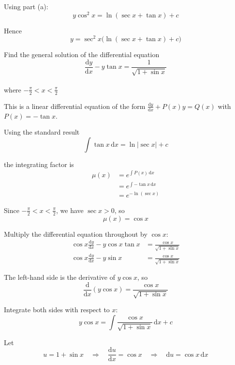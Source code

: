 \documentclass[leqno]{article}
\begin{document}
\begin{enumerate}[
  label=\textbf{\arabic*.},
  leftmargin=*,
  topsep=0pt,
  partopsep=0pt,
  parsep=0pt
]
\begin{djsSolution}
\begin{enumerate}[label=\textbf{(\alph*)}]
  Using part (a):
  \[
  y\cos^2 x=\ln(\sec x+\tan x)+c
  \]

  Hence
  \[
  y=\sec^2 x\bigl(\ln(\sec x+\tan x)+c\bigr)
  \]
\end{enumerate}
\end{djsSolution}


\newpage

\questionitem

Find the general solution of the differential equation\\
\[
\frac{\mathrm{d}y}{\mathrm{d}x} - y\tan x = \frac{1}{\sqrt{1+\sin x}}
\] \\
where $-\tfrac{\pi}{2} < x < \tfrac{\pi}{2}$ 

\vspace*{10pt}

\begin{djsSolution}
This is a linear differential equation of the form \(\frac{\mathrm{d}y}{\mathrm{d}x}+P(x)y=Q(x)\) with \(P(x)=-\tan x\).

Using the standard result
\[
\int \tan x\,\mathrm{d}x=\ln|\sec x|+c
\]

the integrating factor is
\begin{align*}
\mu(x)
&= e^{\int P(x)\,\mathrm{d}x} \\
&= e^{\int -\tan x\,\mathrm{d}x} \\
&= e^{-\ln(\sec x)}
\end{align*}

Since $-\tfrac{\pi}{2}<x<\tfrac{\pi}{2}$, we have $\sec x>0$, so
\[
\mu(x)=\cos x
\]

Multiply the differential equation throughout by $\cos x$:
\begin{align*}
\cos x\frac{\mathrm{d}y}{\mathrm{d}x} - y\cos x\tan x
&= \frac{\cos x}{\sqrt{1+\sin x}} \\
\cos x\frac{\mathrm{d}y}{\mathrm{d}x} - y\sin x
&= \frac{\cos x}{\sqrt{1+\sin x}}
\end{align*}

The left-hand side is the derivative of $y\cos x$, so
\[
\frac{\mathrm{d}}{\mathrm{d}x}(y\cos x)=\frac{\cos x}{\sqrt{1+\sin x}}
\]

Integrate both sides with respect to $x$:
\[
y\cos x=\int \frac{\cos x}{\sqrt{1+\sin x}}\,\mathrm{d}x + c
\]

Let
\[
u=1+\sin x
\quad\Longrightarrow\quad
\frac{\mathrm{d}u}{\mathrm{d}x}=\cos x
\quad\Longrightarrow\quad
\mathrm{d}u=\cos x\,\mathrm{d}x
\]


\end{djsSolution}
\end{enumerate}
\end{document}
